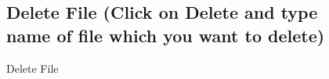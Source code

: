 \begin{figure}[h]
\subsection{Delete File (Click on Delete and type name of file which you want
to delete) }
  \centering
   \caption{Delete File}
\end{figure}





